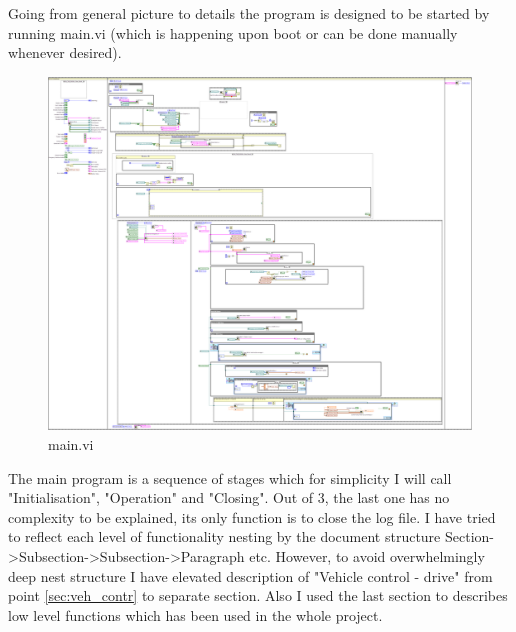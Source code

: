 \label{apx:doc}
Going from general picture to details the program is designed to be started by running main.vi (which is happening upon boot or can be done manually whenever desired).
\begin{figure}[!h]
    \centering
    \includegraphics[width=\textwidth]{figures/Run_maind.png}
    \caption{main.vi}
    \label{vi:main}
\end{figure}

The main program is a sequence of stages which for simplicity I will call "Initialisation", "Operation" and "Closing". Out of 3, the last one has no complexity to be explained, its only function is to close the log file. 
I have tried to reflect each level of functionality nesting by the document structure Section->Subsection->Subsection->Paragraph etc. However, to avoid overwhelmingly deep nest structure I have elevated description of "Vehicle control - drive" from point \ref{sec:veh_contr} to separate section. Also I used the last section to describes low level functions which has been used in the whole project.

